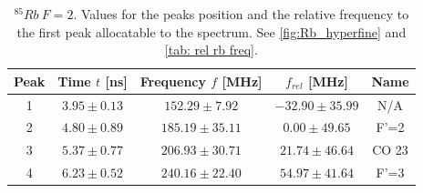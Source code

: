 \documentclass[]{article}
\begin{document}
\begin{table}[H]
\centering
\begin{tabular}{|c|c|c|||c|c|}
\hline
Peak & Time $t$ [ns] & Frequency $f$ [MHz] & $f_{rel}$ [MHz] & Name \\ \hline\hline
1 & $3.95 \pm 0.13$  & $152.29 \pm 7.92$  & $-32.90 \pm 35.99$  & N/A \\ \hline
2 & $4.80 \pm 0.89$  & $185.19 \pm 35.11$  & $0.00 \pm 49.65$  & F'=2 \\ \hline
3 & $5.37 \pm 0.77$  & $206.93 \pm 30.71$  & $21.74 \pm 46.64$  & CO 23 \\ \hline
4 & $6.23 \pm 0.52$  & $240.16 \pm 22.40$  & $54.97 \pm 41.64$  & F'=3 \\ \hline
\hline
\end{tabular}
\caption{$^{85}Rb\ F=2 $. Values for the peaks position and the relative frequency to the first peak allocatable to the spectrum. See \autoref{fig:Rb_hyperfine} and \autoref{tab: rel rb freq}.}
\end{table}


\newpage
\end{document}
